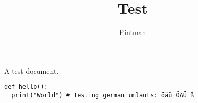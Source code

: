 \documentclass[12pt,a4paper]{scrartcl}
\author{Pintman}
\title{Test}
\begin{document}
A test document.

\begin{lstlisting}
def hello():
  print("World") # Testing german umlauts: öäü ÖÄÜ ß
\end{lstlisting}
	
\end{document}
